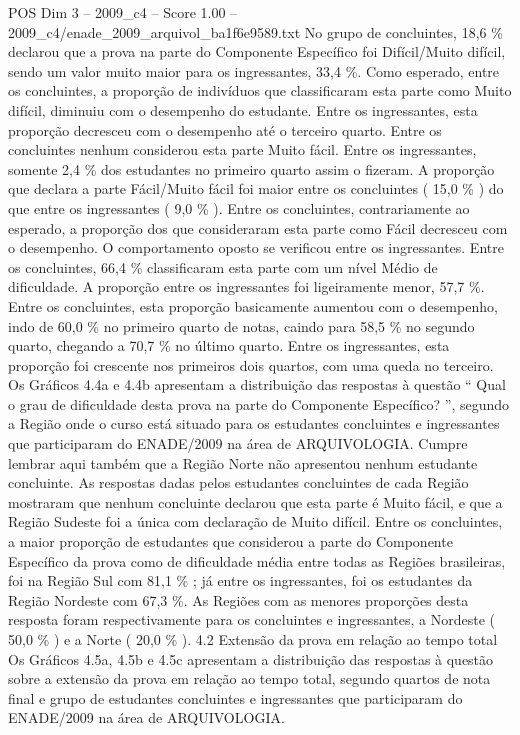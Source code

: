 \begin{textsample}{POS Dim 3 – 2009\_c4 – Score 1.00 – 2009\_c4/enade\_2009\_arquivol\_ba1f6e9589.txt}
No grupo de concluintes, 18,6 \% declarou que a prova na parte do Componente Específico foi Difícil/Muito difícil, sendo um valor muito maior para os ingressantes, 33,4 \%.
Como esperado, entre os concluintes, a proporção de indivíduos que classificaram esta parte como Muito difícil, diminuiu com o desempenho do estudante.
Entre os ingressantes, esta proporção decresceu com o desempenho até o terceiro quarto.
Entre os concluintes nenhum considerou esta parte Muito fácil.
Entre os ingressantes, somente 2,4 \% dos estudantes no primeiro quarto assim o fizeram.
A proporção que declara a parte Fácil/Muito fácil foi maior entre os concluintes ( 15,0 \% ) do que entre os ingressantes ( 9,0 \% ).
Entre os concluintes, contrariamente ao esperado, a proporção dos que consideraram esta parte como Fácil decresceu com o desempenho.
O comportamento oposto se verificou entre os ingressantes.
Entre os concluintes, 66,4 \% classificaram esta parte com um nível Médio de dificuldade.
A proporção entre os ingressantes foi ligeiramente menor, 57,7 \%.
Entre os concluintes, esta proporção basicamente aumentou com o desempenho, indo de 60,0 \% no primeiro quarto de notas, caindo para 58,5 \% no segundo quarto, chegando a 70,7 \% no último quarto.
Entre os ingressantes, esta proporção foi crescente nos primeiros dois quartos, com uma queda no terceiro.
Os Gráficos 4.4a e 4.4b apresentam a distribuição das respostas à questão “ Qual o grau de dificuldade desta prova na parte do Componente Específico? ”, segundo a Região onde o curso está situado para os estudantes concluintes e ingressantes que participaram do ENADE/2009 na área de ARQUIVOLOGIA.
Cumpre lembrar aqui também que a Região Norte não apresentou nenhum estudante concluinte.
As respostas dadas pelos estudantes concluintes de cada Região mostraram que nenhum concluinte declarou que esta parte é Muito fácil, e que a Região Sudeste foi a única com declaração de Muito difícil.
Entre os concluintes, a maior proporção de estudantes que considerou a parte do Componente Específico da prova como de dificuldade média entre todas as Regiões brasileiras, foi na Região Sul com 81,1 \% ; já entre os ingressantes, foi os estudantes da Região Nordeste com 67,3 \%.
As Regiões com as menores proporções desta resposta foram respectivamente para os concluintes e ingressantes, a Nordeste ( 50,0 \% ) e a Norte ( 20,0 \% ). 4.2 Extensão da prova em relação ao tempo total Os Gráficos 4.5a, 4.5b e 4.5c apresentam a distribuição das respostas à questão sobre a extensão da prova em relação ao tempo total, segundo quartos de nota final e grupo de estudantes concluintes e ingressantes que participaram do ENADE/2009 na área de ARQUIVOLOGIA.

\end{textsample}

